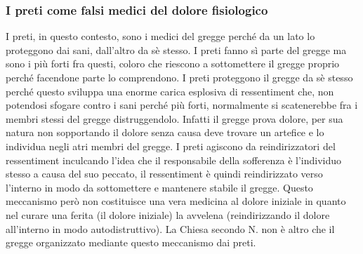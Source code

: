 \documentclass[10pt,a4paper]{article}
\begin{document}
\subsubsection{I preti come falsi medici del dolore fisiologico}
I preti, in questo contesto, sono i medici del gregge perché da un lato lo proteggono dai sani, dall'altro da sè stesso.  I preti fanno sì parte del gregge ma sono i più forti fra questi, coloro che riescono a sottomettere il gregge proprio perché facendone parte lo comprendono. I preti proteggono il gregge da sè stesso perché questo sviluppa una enorme carica esplosiva di ressentiment che, non potendosi sfogare contro i sani perché più forti, normalmente si scatenerebbe fra i membri stessi del gregge distruggendolo. Infatti il gregge prova dolore, per sua natura non sopportando il dolore senza causa deve trovare un artefice e lo individua negli atri membri del gregge. I preti agiscono da reindirizzatori del ressentiment inculcando l'idea che il responsabile della sofferenza è l'individuo stesso a causa del suo peccato, il ressentiment è quindi reindirizzato verso l'interno in modo da sottomettere e mantenere stabile il gregge. Questo meccanismo però non costituisce una vera medicina al dolore iniziale in quanto nel curare una ferita (il dolore iniziale) la avvelena (reindirizzando il dolore all'interno in modo autodistruttivo). La Chiesa secondo N. non è altro che il gregge organizzato mediante questo meccanismo dai preti.\\
\end{document}
